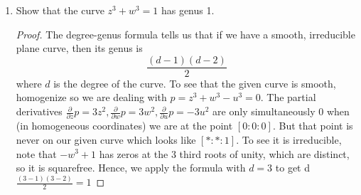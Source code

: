 \documentclass{article}
\begin{document}
\begin{enumerate}
	https://math.stackexchange.com/questions/376677/characterization-of-harmonic-functions-on-the-punctured-disk
	\begin{proof}
		The maximum modulus principle tells us that $f$ is holomorphic on $|z|<1$, then $|f|$ does not 
		attain a maximum on $|z| < 1$, and so any maximum must occur on $|z| = 1$. If a function $f$
		is harmonic on $\{z: 0 < |z| < 1\}$, it admits an analytic continuation on $\{z: |z| \leq 1\}$ 
		call this continuation $F$. Then $|F|$ attains its maximum on $|z|=1$. Since $F=0$ on $|z|=1$,
		$|F| \leq 0$ on the whole punctured disk, and so $f$ must be identically $0$.
	\end{proof}
	
	\item Show that the curve $z^3+w^3=1$ has genus 1.
	
	\begin{proof}
		The degree-genus formula tells us that if we have a smooth, irreducible plane curve, then 
		its genus is 
		\[ \frac{(d-1)(d-2)}{2}\]
		where $d$ is the degree of the curve. To see that the given curve is smooth, homogenize
		so we are dealing with $p = z^3+w^3-u^3 = 0$. The partial derivatives 
		$\frac{\partial}{\partial z} p = 3z^2,
		\frac{\partial}{\partial w} p = 3w^2,
		\frac{\partial}{\partial u} p = -3u^2$
		are only simultaneously $0$ when (in homogeneous coordinates) we are at the point 
		$[0:0:0]$. But that point is never on our given curve which looks like
		$[* : * : 1]$. To see it is irreducible, note that $-w^3+1$ has zeros at the 3 third roots of unity,
		which are distinct, so it is squarefree. Hence, we apply the formula with $d=3$ to get 
		d$\frac{(3-1)(3-2)}{2} = 1$
		\end{proof}
		
\end{enumerate}
\end{document}
